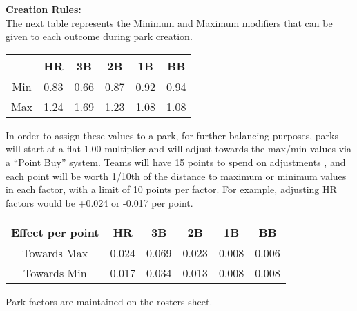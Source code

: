 \textbf{Creation Rules:}\\
The next table represents the Minimum and Maximum modifiers that can be given to each outcome during park creation.

\begin{center}
      \begin{tabular}{|c|c|c|c|c|c|}
	\hline
	& HR & 3B & 2B & 1B & BB \\
	\hline
	Min & 0.83 & 0.66 & 0.87 & 0.92 & 0.94 \\
	\hline
	Max & 1.24 & 1.69 & 1.23 & 1.08 & 1.08 \\
	\hline
     \end{tabular}
\end{center}

In order to assign these values to a park, for further balancing purposes, parks will start at a flat 1.00 multiplier and
 will adjust towards the max/min values via a “Point Buy” system. Teams will have 15 points to spend on adjustments
, and each point will be worth 1/10th of the distance to maximum or minimum values in each factor, with a limit of 10
 points per factor. For example, adjusting HR factors would be +0.024 or -0.017 per point.

\begin{center}
      \begin{tabular}{|c|c|c|c|c|c|}
	\hline
	Effect per point & HR & 3B & 2B & 1B & BB \\
	\hline
	Towards Max & 0.024 & 0.069 & 0.023 & 0.008 & 0.006 \\
	\hline
	Towards Min & 0.017 & 0.034 & 0.013 & 0.008 & 0.008 \\
	\hline
     \end{tabular}
\end{center}
Park factors are maintained on the rosters sheet.
